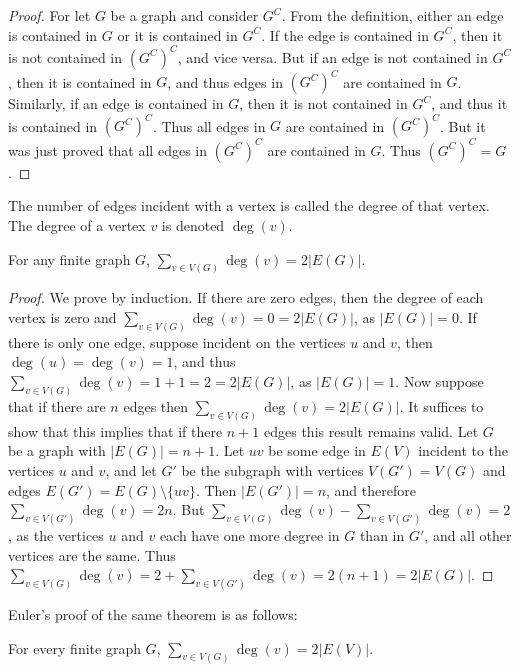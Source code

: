         \begin{proof}
            For let $G$ be a graph and consider $G^C$.
            From the definition, either an edge is contained
            in $G$ or it is contained in $G^C$. If the edge
            is contained in $G^C$, then it is not contained
            in $(G^C)^C$, and vice versa. But if an edge is
            not contained in $G^C$, then it is contained in
            $G$, and thus edges in $(G^C)^C$ are contained in
            $G$. Similarly, if an edge is contained in $G$, then
            it is not contained in $G^C$, and thus it is contained
            in $(G^C)^C$. Thus all edges in $G$ are contained
            in $(G^C)^C$. But it was just proved that all edges
            in $(G^C)^{C}$ are contained in $G$.
            Thus $(G^C)^{C}=G$.
        \end{proof}
        \begin{definition}
        The number of edges incident with a vertex is called the degree of that vertex. The degree of a vertex $v$ is denoted $\deg(v)$.
        \end{definition}
        \begin{theorem}
        For any finite graph $G$, $\sum_{v\in V(G)} \deg(v) = 2|E(G)|$.
        \end{theorem}
        \begin{proof}
        We prove by induction. If there are zero edges, then the degree of each vertex is zero and $\sum_{v\in V(G)}\deg(v) = 0 = 2|E(G)|$, as $|E(G)| = 0$. If there is only one edge, suppose incident on the vertices $u$ and $v$, then $\deg(u) = \deg(v) = 1$, and thus $\sum_{v\in V(G)} \deg(v) = 1+1 = 2 = 2|E(G)|$, as $|E(G)| = 1$. Now suppose that if there are $n$ edges then $\sum_{v\in V(G)}\deg(v) = 2|E(G)|$. It suffices to show that this implies that if there $n+1$ edges this result remains valid. Let $G$ be a graph with $|E(G)| = n+1$. Let $uv$ be some edge in $E(V)$ incident to the vertices $u$ and $v$, and let $G'$ be the subgraph with vertices $V(G') = V(G)$ and edges $E(G')=E(G)\setminus \{uv\}$. Then $|E(G')| = n$, and therefore $\sum_{v\in V(G')}\deg(v) = 2n$. But $\sum_{v\in V(G)} \deg(v) - \sum_{v\in V(G')}\deg(v) = 2$, as the vertices $u$ and $v$ each have one more degree in $G$ than in $G'$, and all other vertices are the same. Thus $\sum_{v\in V(G)}\deg(v) = 2 + \sum_{v\in V(G')}\deg(v) = 2(n+1) = 2|E(G)|$.
        \end{proof}
        Euler's proof of the same theorem is as follows:
        \begin{theorem}
        For every finite graph $G$, $\sum_{v\in V(G)}\deg(v) = 2|E(V)|$.
        \end{theorem}

